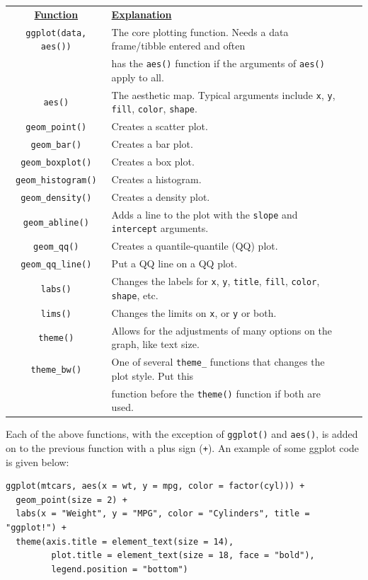 \documentclass[11pt]{article}
\begin{document}
\begin{longtable}{clcc}
	\underline{\bf Function} & \underline{\bf Explanation}\\
	\texttt{ggplot(data, aes())} & The core plotting function. Needs a data frame/tibble entered and often \\
	& has the \texttt{aes()} function if the arguments of \texttt{aes()} apply to all.\\
	\texttt{aes()} & The aesthetic map. Typical arguments include \texttt{x}, \texttt{y}, \texttt{fill}, \texttt{color}, \texttt{shape}.\\
	\texttt{geom\_point()} & Creates a scatter plot. \\
	\texttt{geom\_bar()} & Creates a bar plot.  \\
	\texttt{geom\_boxplot()} & Creates a box plot. \\
	\texttt{geom\_histogram()} & Creates a histogram. \\
	\texttt{geom\_density()} & Creates a density plot. \\
	\texttt{geom\_abline()} & Adds a line to the plot with the \texttt{slope} and \texttt{intercept} arguments. \\
	\texttt{geom\_qq()} & Creates a quantile-quantile (QQ) plot. \\
	\texttt{geom\_qq\_line()} & Put a QQ line on a QQ plot. \\
	\texttt{labs()} & Changes the labels for  \texttt{x}, \texttt{y},  \texttt{title}, \texttt{fill}, \texttt{color}, \texttt{shape}, etc.\\
	\texttt{lims()} & Changes the limits on \texttt{x}, or \texttt{y} or both.\\
	\texttt{theme()} & Allows for the adjustments of many options on the graph, like text size.\\
	\texttt{theme\_bw()} & One of several \texttt{theme\_} functions that changes the plot style. Put this \\
	& function before the \texttt{theme()} function if both are used.
\end{longtable}

Each of the above functions, with the exception of \texttt{ggplot()} and \texttt{aes()}, is added on to the previous function with a plus sign (\texttt{+}). An example of some ggplot code is given below:

\begin{verbatim}
ggplot(mtcars, aes(x = wt, y = mpg, color = factor(cyl))) +
  geom_point(size = 2) +
  labs(x = "Weight", y = "MPG", color = "Cylinders", title = "ggplot!") +
  theme(axis.title = element_text(size = 14),
         plot.title = element_text(size = 18, face = "bold"),
         legend.position = "bottom")
\end{verbatim}
\end{document}
